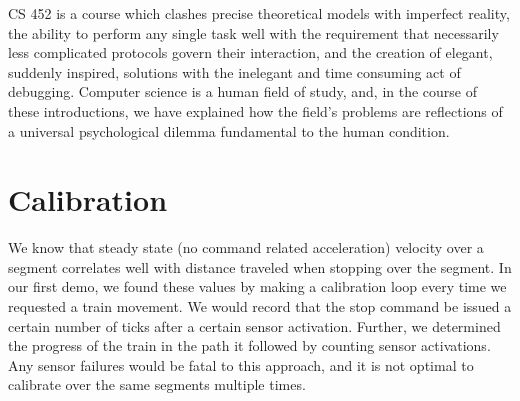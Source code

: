 \documentclass{amsart} \usepackage{amsmath} \usepackage{upgreek}
\begin{document}
CS 452 is a course which clashes precise theoretical models with imperfect reality, the ability to perform any single task well with the requirement that necessarily less complicated protocols govern their interaction, and the creation of elegant, suddenly inspired, solutions with the inelegant and time consuming act of debugging. Computer science is a human field of study, and, in the course of these introductions, we have explained how the field's problems are reflections of a universal psychological dilemma fundamental to the human condition.

\section*{Calibration}

We know that steady state (no command related acceleration) velocity over a segment correlates well with distance traveled when stopping over the segment. In our first demo, we found these values by making a calibration loop every time we requested a train movement. We would record that the stop command be issued a certain number of ticks after a certain sensor activation. Further, we determined the progress of the train in the path it followed by counting sensor activations. Any sensor failures would be fatal to this approach, and it is not optimal to calibrate over the same segments multiple times.
\end{document}

